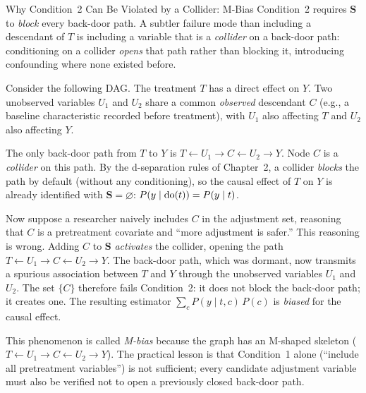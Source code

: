 \documentclass[master.tex]{subfiles}
\begin{document}
\begin{warn}{Why Condition~2 Can Be Violated by a Collider: M-Bias}
Condition~2 requires $\mathbf{S}$ to \emph{block} every back-door path.
A subtler failure mode than including a descendant of $T$ is including a
variable that is a \emph{collider} on a back-door path: conditioning on a
collider \emph{opens} that path rather than blocking it, introducing
confounding where none existed before.

Consider the following DAG. The treatment $T$ has a direct effect on $Y$.
Two unobserved variables $U_1$ and $U_2$ share a common \emph{observed}
descendant $C$ (e.g., a baseline characteristic recorded before treatment),
with $U_1$ also affecting $T$ and $U_2$ also affecting $Y$.

\begin{center}
\end{center}

\noindent
The only back-door path from $T$ to $Y$ is
$T \leftarrow U_1 \to C \leftarrow U_2 \to Y$.
Node $C$ is a \emph{collider} on this path.  By the d-separation rules of
Chapter~2, a collider \emph{blocks} the path by default (without any
conditioning), so the causal effect of $T$ on $Y$ is already identified
with $\mathbf{S} = \varnothing$: $P(y \mid \mathrm{do}(t)) = P(y \mid t)$.

Now suppose a researcher naively includes $C$ in the adjustment set,
reasoning that $C$ is a pretreatment covariate and ``more adjustment is
safer.''  This reasoning is wrong.  Adding $C$ to $\mathbf{S}$
\emph{activates} the collider, opening the path
$T \leftarrow U_1 \to C \leftarrow U_2 \to Y$.  The back-door path, which
was dormant, now transmits a spurious association between $T$ and $Y$
through the unobserved variables $U_1$ and $U_2$.  The set $\{C\}$
therefore fails Condition~2: it does not block the back-door path; it
creates one.  The resulting estimator $\sum_c P(y \mid t, c)\,P(c)$ is
\emph{biased} for the causal effect.

This phenomenon is called \emph{M-bias} because the graph has an M-shaped
skeleton ($T \leftarrow U_1 \to C \leftarrow U_2 \to Y$).  The practical
lesson is that Condition~1 alone (``include all pretreatment variables'')
is not sufficient; every candidate adjustment variable must also be
verified not to open a previously closed back-door path.
\end{warn}
\end{document}
